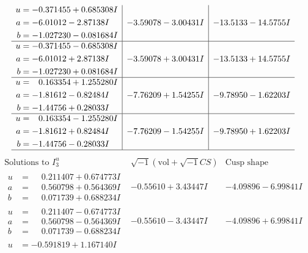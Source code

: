 \documentclass[1p]{elsarticle_modified}
\theoremstyle{definition}
\newcommand{\I}{\sqrt{-1}}
\begin{document}
$$\begin{array}{c|c|c}
\begin{aligned}
u &= -0.371455 + 0.685308 I \\
a &= -6.01012 - 2.87138 I \\
b &= -1.027230 - 0.081684 I\end{aligned}
 & -3.59078 - 3.00431 I & -13.5133 - 14.5755 I \\ \hline\begin{aligned}
u &= -0.371455 - 0.685308 I \\
a &= -6.01012 + 2.87138 I \\
b &= -1.027230 + 0.081684 I\end{aligned}
 & -3.59078 + 3.00431 I & -13.5133 + 14.5755 I \\ \hline\begin{aligned}
u &= \phantom{-}0.163354 + 1.255280 I \\
a &= -1.81612 - 0.82484 I \\
b &= -1.44756 + 0.28033 I\end{aligned}
 & -7.76209 + 1.54255 I & -9.78950 - 1.62203 I \\ \hline\begin{aligned}
u &= \phantom{-}0.163354 - 1.255280 I \\
a &= -1.81612 + 0.82484 I \\
b &= -1.44756 - 0.28033 I\end{aligned}
 & -7.76209 - 1.54255 I & -9.78950 + 1.62203 I\\
 \hline 
 \end{array}$$\newpage$$\begin{array}{c|c|c}  
\text{Solutions to }I^u_{3}& \I (\text{vol} + \sqrt{-1}CS) & \text{Cusp shape}\\
 \hline 
\begin{aligned}
u &= \phantom{-}0.211407 + 0.674773 I \\
a &= \phantom{-}0.560798 + 0.564369 I \\
b &= \phantom{-}0.071739 + 0.688234 I\end{aligned}
 & -0.55610 + 3.43447 I & -4.09896 - 6.99841 I \\ \hline\begin{aligned}
u &= \phantom{-}0.211407 - 0.674773 I \\
a &= \phantom{-}0.560798 - 0.564369 I \\
b &= \phantom{-}0.071739 - 0.688234 I\end{aligned}
 & -0.55610 - 3.43447 I & -4.09896 + 6.99841 I \\ \hline\begin{aligned}
u &= -0.591819 + 1.167140 I \\

\end{aligned}
\end{array}$$
\end{document}

